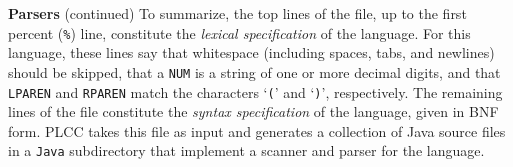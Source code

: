 \begin{minipage}[t]{\sw}
\slidenumber
\LARGE
{\bf Parsers} (continued)\exx
\Large
\emm\LightBox{\MYlonGrammar}\exx
\LARGE
To summarize,
the top lines of the file, up to the first percent (\verb'%') line,
constitute the {\em lexical specification} of the language.
For this language, these lines say that whitespace
(including spaces, tabs, and newlines) should be skipped,
that a \verb'NUM' is a string of one or more decimal digits,
and that \verb'LPAREN' and \verb'RPAREN' match
the characters `\verb'('' and `\verb')'', respectively.\exx
The remaining lines of the file constitute the {\em syntax specification}
of the language, given in BNF form.
PLCC takes this file as input and generates a collection
of Java source files in a \verb'Java' subdirectory
that implement a scanner and parser for the language.
\end{minipage}
\clearpage
